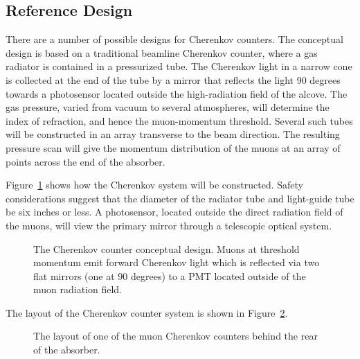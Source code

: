 \subsection{Reference Design}

There are a number of possible designs for Cherenkov counters. The
conceptual design is based on a traditional beamline Cherenkov
counter, where a gas radiator is contained in a pressurized tube. The
Cherenkov light in a narrow cone is collected at the end of the tube
by a mirror that reflects the light 90 degrees towards a photosensor
located outside the high-radiation field of the alcove. The gas
pressure, varied from vacuum to several atmospheres, will determine
the index of refraction, and hence the muon-momentum
threshold. Several such tubes will be constructed in an array
transverse to the beam direction. The resulting pressure scan will
give the momentum distribution of the muons at an array of points
across the end of the absorber.  

Figure~\ref{fig:CherenkovCounterDetail} shows how the
Cherenkov system will 
be constructed. Safety considerations suggest that the
diameter of the radiator tube and light-guide tube be six inches
or less.  A 
photosensor, located outside the direct radiation field of the muons, will
view the primary mirror through a telescopic optical system.

\begin{figure}[htbp]
\begin{center}
\caption[Cherenkov counter design]{ The Cherenkov counter conceptual design. 
Muons at threshold momentum emit forward Cherenkov light which is
reflected via two flat mirrors (one at 90 degrees) 
to a PMT located outside of the muon
radiation field. }
\label{fig:CherenkovCounterDetail}
\end{center}
\end{figure}

The layout of the Cherenkov counter system is shown in
Figure~\ref{fig:CherenkovCounterLayout}.

\begin{figure}[htbp]
\begin{center}
\caption[Cherenkov counter layout]{The layout of one of the muon 
Cherenkov counters behind the rear of the absorber.}
\label{fig:CherenkovCounterLayout}
\end{center}
\end{figure}


